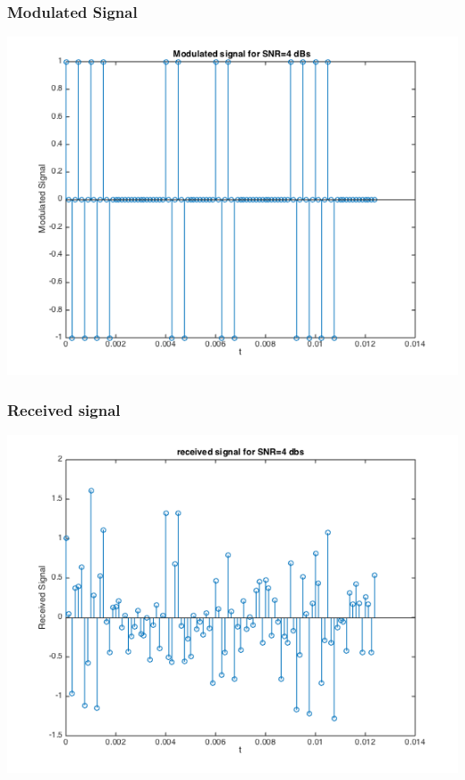 \documentclass[11pt]{scrartcl}
\begin{document}
\subsubsection{Modulated Signal}
\begin{minipage}[t]{\linewidth}
{
\includegraphics[scale = 0.6]{Modulated_signal.png}
}
\end{minipage}
\medskip

\subsubsection{Received signal}
\begin{minipage}[t]{\linewidth}
{
\includegraphics[scale = 0.6]{received_signal.png}
}
\end{minipage}
\medskip
\end{document}
